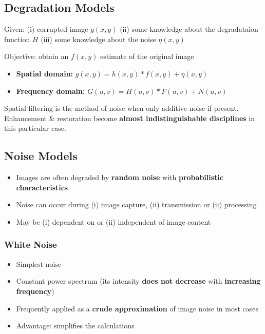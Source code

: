 \subsection*{Degradation Models}

Given: (i) corrupted image $g(x, y)$ (ii) some knowledge about the
degradataion function $H$ (iii) some knowledge about the noise $\eta(x, y)$

Objective: obtain an $f(x, y)$ estimate of the original image

\begin{itemize}
  \item \textbf{Spatial domain:} $g(x, y) = h(x, y) * f(x, y) + \eta(x, y)$
  \item \textbf{Frequency domain:} $G(u, v) = H(u, v) * F(u, v) + N(u, v)$
\end{itemize}

Spatial filtering is the method of noise when only additive noise if
present. Enhancement \& restoration become \textbf{almost
indistinguishable disciplines} in this particular case.

\subsection*{Noise Models}

\begin{itemize}
  \item Images are often degraded by \textbf{random noise} with
    \textbf{probabilistic characteristics}
  \item Noise can occur during (i) image capture, (ii) transmission
    or (ii) processing
  \item May be (i) dependent on or (ii) independent of image content
\end{itemize}

\subsubsection*{White Noise}

\begin{itemize}
  \item Simplest noise
  \item Constant power spectrum (its intensity \textbf{does not
    decrease} with \textbf{increasing frequency})
  \item Frequently applied as a \textbf{crude approximation} of image
    noise in most cases
  \item Advantage: simplifies the calculations
\end{itemize}


